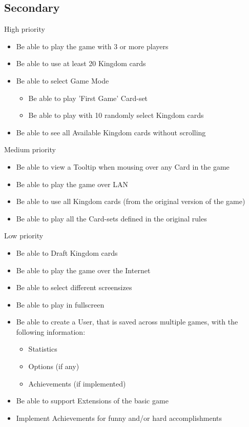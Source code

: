 \documentclass[12pt,a4paper,notitlepage]{article}
\begin{document}
\subsection{Secondary}
High priority
\begin{itemize}
\item Be able to play the game with 3 or more players
\item Be able to use at least 20 Kingdom cards
\item Be able to select Game Mode
\begin{itemize}
\item Be able to play 'First Game' Card-set
\item Be able to play with 10 randomly select Kingdom cards
\end{itemize}
\item Be able to see all Available Kingdom cards without scrolling
\end{itemize}
Medium priority
\begin{itemize}
\item Be able to view a Tooltip when mousing over any Card in the game
\item Be able to play the game over LAN
\item Be able to use all Kingdom cards (from the original version of the game)
\item Be able to play all the Card-sets defined in the original rules
\end{itemize}
Low priority
\begin{itemize}
\item Be able to Draft Kingdom cards
\item Be able to play the game over the Internet
\item Be able to select different screensizes
\item Be able to play in fullscreen
\item Be able to create a User, that is saved across multiple games, with the following information:
\begin{itemize}
\item Statistics
\item Options (if any)
\item Achievements (if implemented)
\end{itemize}
\item Be able to support Extensions of the basic game
\item Implement Achievements for funny and/or hard accomplishments
\end{itemize}
\pagebreak
\end{document}
